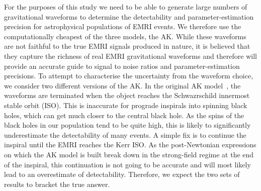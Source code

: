\documentclass[a4paper]{jpconf}
\begin{document}
For the purposes of this study we need to be able to generate large numbers of gravitational waveforms to determine the detectability and parameter-estimation precision for astrophysical populations of EMRI events. We therefore use the computationally cheapest of the three models, the AK. While these waveforms are not faithful to the true EMRI signals produced in nature, it is believed that they capture the richness of real EMRI gravitational waveforms and therefore will provide an accurate guide to signal to noise ratios and parameter-estimation precisions. To attempt to characterise the uncertainty from the waveform choice, we consider two different versions of the AK. In the original AK model~\cite{AK}, the waveforms are terminated when the object reaches the Schwazrschild innermost stable orbit (ISO). This is inaccurate for prograde inspirals into spinning black holes, which can get much closer to the central black hole. As the spins of the black holes in our population tend to be quite high, this is likely to significantly underestimate the detectability of many events. A simple fix is to continue the inspiral until the EMRI reaches the Kerr ISO. As the post-Newtonian expressions on which the AK model is built break down in the strong-field regime at the end of the inspiral, this continuation is not going to be accurate and will most likely lead to an overestimate of detectability. Therefore, we expect the two sets of results to bracket the true answer.
\end{document}
